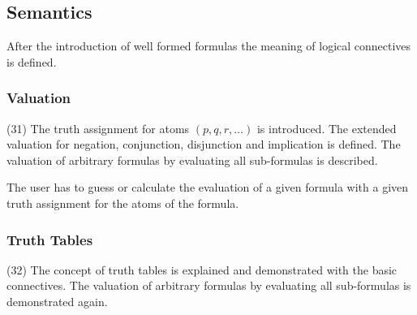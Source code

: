 
%



%


\subsection{Semantics}

After the introduction of well formed formulas the meaning of logical connectives is defined.

\subsubsection{Valuation}
\label{tut:31}
(31)
The truth assignment for atoms $(p,q,r,…)$ is introduced. 
The extended valuation for negation, conjunction, disjunction and implication is defined.
The valuation of arbitrary formulas by evaluating all sub-formulas is described.

The user has to guess or calculate the evaluation of a given formula with a given truth assignment for the atoms of the formula.

\subsubsection{Truth Tables}
\label{tut:32}
(32)
The concept of truth tables is explained and demonstrated with the basic connectives. 
The valuation of arbitrary formulas by evaluating all sub-formulas is demonstrated again.

